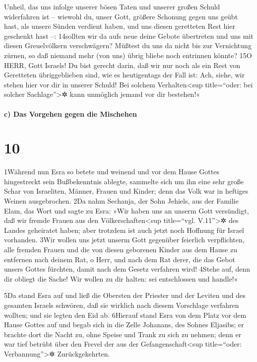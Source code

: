 Unheil, das uns infolge unserer bösen Taten und unserer großen Schuld
widerfahren ist -- wiewohl du, unser Gott, größere Schonung gegen uns
geübt hast, als unsere Sünden verdient haben, und uns diesen geretteten
Rest hier geschenkt hast --: 14sollten wir da aufs neue deine Gebote
übertreten und uns mit diesen Greuelvölkern verschwägern? Müßtest du uns
da nicht bis zur Vernichtung zürnen, so daß niemand mehr (von uns) übrig
bliebe noch entrinnen könnte? 15O HERR, Gott Israels! Du bist gerecht
darin, daß wir nur noch als ein Rest von Geretteten übriggeblieben sind,
wie es heutigentags der Fall ist: Ach, siehe, wir stehen hier vor dir in
unserer Schuld! Bei solchem Verhalten\textless sup title=``oder: bei
solcher Sachlage''\textgreater✲ kann unmöglich jemand vor dir bestehen!«

\hypertarget{c-das-vorgehen-gegen-die-mischehen}{%
\paragraph{c) Das Vorgehen gegen die
Mischehen}\label{c-das-vorgehen-gegen-die-mischehen}}

\hypertarget{section-9}{%
\section{10}\label{section-9}}

1Während nun Esra so betete und weinend und vor dem Hause Gottes
hingestreckt sein Bußbekenntnis ablegte, sammelte sich um ihn eine sehr
große Schar von Israeliten, Männer, Frauen und Kinder; denn das Volk war
in heftiges Weinen ausgebrochen. 2Da nahm Sechanja, der Sohn Jehiels,
aus der Familie Elam, das Wort und sagte zu Esra: »Wir haben uns an
unserm Gott versündigt, daß wir fremde Frauen aus den
Völkerschaften\textless sup title=``vgl. V.11''\textgreater✲ des Landes
geheiratet haben; aber trotzdem ist auch jetzt noch Hoffnung für Israel
vorhanden. 3Wir wollen uns jetzt unserm Gott gegenüber feierlich
verpflichten, alle fremden Frauen und die von diesen geborenen Kinder
aus dem Hause zu entfernen nach deinem Rat, o Herr, und nach dem Rat
derer, die das Gebot unsers Gottes fürchten, damit nach dem Gesetz
verfahren wird! 4Stehe auf, denn dir obliegt die Sache! Wir wollen zu
dir halten: sei entschlossen und handle!«

5Da stand Esra auf und ließ die Obersten der Priester und der Leviten
und des gesamten Israels schwören, daß sie wirklich nach diesem
Vorschlage verfahren wollten; und sie legten den Eid ab. 6Hierauf stand
Esra von dem Platz vor dem Hause Gottes auf und begab sich in die Zelle
Johanans, des Sohnes Eljasibs; er brachte dort die Nacht zu, ohne Speise
und Trank zu sich zu nehmen; denn er war tief betrübt über den Frevel
der aus der Gefangenschaft\textless sup title=``oder:
Verbannung''\textgreater✲ Zurückgekehrten.

